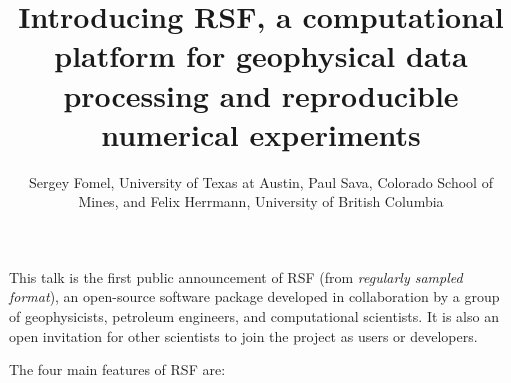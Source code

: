 \renewcommand{\thefootnote}{\fnsymbol{footnote}} 

\title{Introducing RSF, a computational platform for geophysical data processing and reproducible numerical experiments}

\author{Sergey Fomel\footnotemark[1], University of Texas at Austin, Paul Sava, Colorado School of Mines, and Felix Herrmann, University of British Columbia}

\maketitle

This talk is the first public announcement of RSF (from
\emph{regularly sampled format}), an open-source software package
developed in collaboration by a group of geophysicists, petroleum
engineers, and computational scientists. It is also an open invitation
for other scientists to join the project as users or developers.

The four main features of RSF are:

